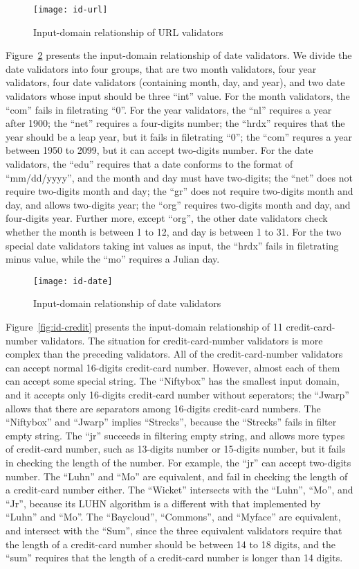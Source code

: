 \begin{figure}
\centering
\texttt{[image: id-url]}
\caption{Input-domain relationship of URL validators}  
\label{fig:id-url}
\end{figure}

Figure~\ref{fig:id-date} presents the input-domain relationship of date validators.
We divide the date validators into four groups, that are two month validators, four year validators, four date validators (containing month, day, and year), and two date validators whose input should be three ``int'' value. 
For the month validators, the ``com'' fails in filetrating ``0''.
For the year validators, the ``nl'' requires a year after 1900; the ``net'' requires a four-digits number; the ``hrdx'' requires that the year should be a leap year, but it fails in filetrating ``0''; the ``com'' requres a year between 1950 to 2099, but it can accept two-digits number. 
For the date validators, the ``edu'' requires that a date conforms to  the format of ``mm/dd/yyyy'', and the month and day must have two-digits; the ``net'' does not require two-digits month and day; the ``gr'' does not require two-digits month and day, and allows two-digits year; the ``org'' requires  two-digits month and day, and four-digits year. Further more, except ``org'', the other date validators check whether the month is between 1 to 12, and day is between 1 to 31. 
For the two special date validators taking int values as input, the ``hrdx'' fails in filetrating minus value, while the ``mo'' requires a Julian day.

\begin{figure}
\centering
\texttt{[image: id-date]}
\caption{Input-domain relationship of date validators}  
\label{fig:id-date}
\end{figure}

Figure~\ref{fig:id-credit} presents the input-domain relationship of 11 credit-card-number validators.
The situation for credit-card-number validators is more complex than the preceding validators. All of the credit-card-number validators can accept normal 16-digits credit-card number. However, almost each of them can accept  some special string. The ``Niftybox'' has the smallest input domain, and it accepts only 16-digits credit-card number without seperators; the ``Jwarp'' allows that there are separators among 16-digits credit-card numbers. The ``Niftybox'' and ``Jwarp'' implies ``Strecks'', because the ``Strecks'' fails in filter empty string. The ``jr'' succeeds in filtering empty string, and allows more types of credit-card number, such as 13-digits number or 15-digits number, but it fails in checking the length of the number. For example, the ``jr'' can accept two-digits number. The ``Luhn'' and ``Mo'' are equivalent, and fail in checking the length of a credit-card number either. The ``Wicket'' intersects with the ``Luhn'', ``Mo'', and ``Jr'', because its LUHN algorithm is a different with that implemented by ``Luhn'' and ``Mo''. The ``Baycloud'', ``Commons'', and ``Myface'' are equivalent, and intersect with  the ``Sum'', since the three equivalent validators require that the length of a credit-card number should be between 14 to 18 digits, and the ``sum'' requires that the length of a credit-card number is longer than 14 digits.


